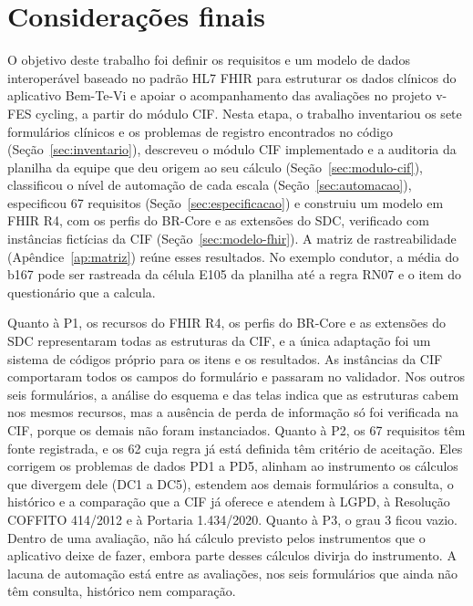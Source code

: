 \chapter{Considerações finais}
\label{cap:consideracoes}

O objetivo deste trabalho foi definir os requisitos e um modelo de dados interoperável baseado no padrão HL7 FHIR
para estruturar os dados clínicos do aplicativo Bem-Te-Vi e apoiar o acompanhamento das avaliações no projeto v-FES
cycling, a partir do módulo CIF. Nesta etapa, o trabalho inventariou os sete formulários clínicos e os problemas de
registro encontrados no código (Seção~\ref{sec:inventario}), descreveu o módulo CIF implementado e a auditoria da
planilha da equipe que deu origem ao seu cálculo (Seção~\ref{sec:modulo-cif}), classificou o nível de automação de
cada escala (Seção~\ref{sec:automacao}), especificou 67 requisitos (Seção~\ref{sec:especificacao}) e construiu um
modelo em FHIR R4, com os perfis do BR-Core e as extensões do SDC, verificado com instâncias fictícias da CIF
(Seção~\ref{sec:modelo-fhir}). A matriz de rastreabilidade (Apêndice~\ref{ap:matriz}) reúne esses resultados. No
exemplo condutor, a média do b167 pode ser rastreada da célula E105 da planilha até a regra RN07 e o item do
questionário que a calcula.

Quanto à P1, os recursos do FHIR R4, os perfis do BR-Core e as extensões do SDC representaram todas as estruturas da
CIF, e a única adaptação foi um sistema de códigos próprio para os itens e os resultados. As instâncias da CIF
comportaram todos os campos do formulário e passaram no validador. Nos outros seis formulários, a análise do
esquema e das telas indica que as estruturas cabem nos mesmos recursos, mas a ausência de perda de informação só foi
verificada na CIF, porque os demais não foram instanciados. Quanto à P2, os 67 requisitos têm fonte registrada, e os
62 cuja regra já está definida têm critério de aceitação. Eles corrigem os problemas de dados PD1 a PD5, alinham ao
instrumento os cálculos que divergem dele (DC1 a DC5), estendem aos demais formulários a consulta, o histórico e a
comparação que a CIF já oferece e atendem à LGPD, à Resolução COFFITO 414/2012 e à Portaria 1.434/2020. Quanto à
P3, o grau 3 ficou vazio. Dentro de uma avaliação, não há cálculo previsto pelos instrumentos que o aplicativo deixe
de fazer, embora parte desses cálculos divirja do instrumento. A lacuna de automação está entre as avaliações, nos
seis formulários que ainda não têm consulta, histórico nem comparação.

